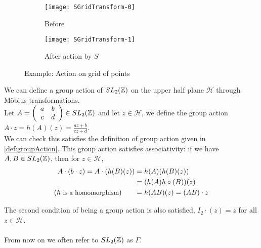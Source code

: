 \begin{figure}[!htbp]
\centering
\begin{subfigure}{.5\textwidth}
  \centering
      \texttt{[image: SGridTransform-0]}
  \caption{Before}
  \label{fig:beforeS}
\end{subfigure}%
\begin{subfigure}{.5\textwidth}
  \centering
      \texttt{[image: SGridTransform-1]}
  \caption{After action by $S$}
  \label{fig:afterS}
\end{subfigure}
\caption{Example: Action on grid of points }
\label{fig:actionS}
\end{figure}

We can define a group action of $SL_2(\mathbb{Z})$ on the upper half plane $\mathcal{H}$ through Möbius transformations. \\
Let $ A = \left(\begin{array}{ c c } a & b \\ c & d \end{array} \right) \in SL_2(\mathbb{Z})$ and let $z \in \mathcal{H}$, we define the group action $A \cdot z = h(A)(z) = \frac{az +b}{cz +d}$.\\
We can check this satisfies the definition of group action given in \ref{def:groupAction}.
This group action satisfies associativity: if we have $A, B \in SL_2(\mathbb{Z})$, then for $z \in \mathcal{H}$, 
\begin{align*}
A \cdot (b \cdot z)  = A \cdot (h(B)(z)) & = h(A)(h(B)(z))  \\
 \quad & = (h(A)h \circ (B))(z)  \\
\small{(h \text{ is a homomorphism})} \quad \quad & = h(AB)(z) = (AB) \cdot z
\end{align*}

The second condition of being a group action is also satisfied, $I_2 \cdot (z) = z$ for all $z \in \mathcal{H}$.\\
\\


From now on we often refer to $SL_2(\mathbb{Z})$ as $\Gamma$. 

